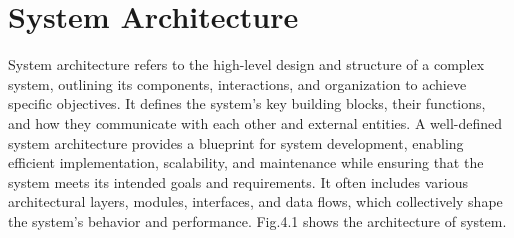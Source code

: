 \justifying 
\section{System Architecture}
System architecture refers to the high-level design and structure of a complex system, outlining its components, interactions, and organization to achieve specific objectives. It defines the system's key building blocks, their functions, and how they communicate with each other and external entities. A well-defined system architecture provides a blueprint for system development, enabling efficient implementation, scalability, and maintenance while ensuring that the system meets its intended goals and requirements. It often includes various architectural layers, modules, interfaces, and data flows, which collectively shape the system's behavior and performance. Fig.4.1 shows the architecture of system.
